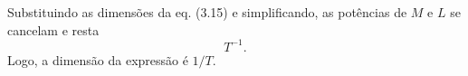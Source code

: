 Substituindo as dimensões da eq. (3.15) e simplificando, as potências de $M$ e $L$ se cancelam e resta
\[
T^{-1}.
\]
Logo, a dimensão da expressão é $1/T$.

